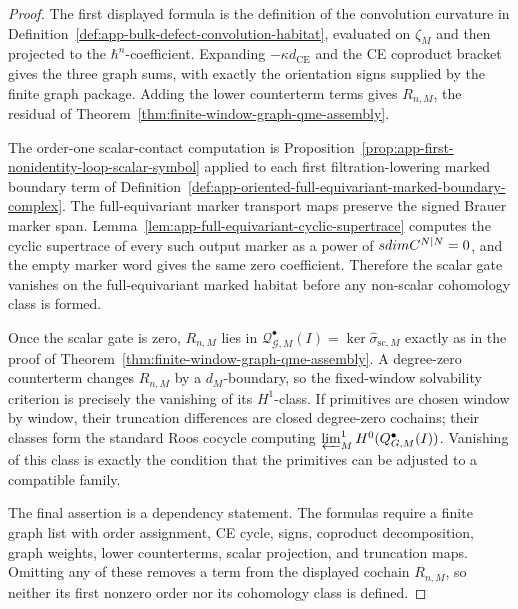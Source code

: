 \begin{proof}
  The first displayed formula is the definition of the convolution
  curvature in
  Definition~\ref{def:app-bulk-defect-convolution-habitat}, evaluated on
  \(\zeta_M\) and then projected to the \(\hbar^n\)-coefficient.  Expanding
  \(-\kappa d_{\mathrm{CE}}\) and the CE coproduct bracket gives the
  three graph sums, with exactly the orientation signs supplied by the
  finite graph package.  Adding the lower counterterm terms gives
  \(R_{n,M}\), the residual of
  Theorem~\ref{thm:finite-window-graph-qme-assembly}.

  The order-one scalar-contact computation is
  Proposition~\ref{prop:app-first-nonidentity-loop-scalar-symbol} applied
  to each first filtration-lowering marked boundary term of
  Definition~\ref{def:app-oriented-full-equivariant-marked-boundary-complex}.
  The full-equivariant marker transport maps preserve the signed Brauer
  marker span.  Lemma~\ref{lem:app-full-equivariant-cyclic-supertrace}
  computes the cyclic supertrace of every such output marker as a power
  of \(\operatorname{sdim}\C^{N|N}=0\), and the empty marker word gives the
  same zero coefficient.  Therefore the scalar gate vanishes on the
  full-equivariant marked habitat before any non-scalar cohomology class
  is formed.

  Once the scalar gate is zero, \(R_{n,M}\) lies in
  \(\mathcal Q^\bullet_{\mathcal G,M}(I)=
  \ker\widehat\sigma_{\mathrm{sc},M}\) exactly as in the proof of
  Theorem~\ref{thm:finite-window-graph-qme-assembly}.  A degree-zero
  counterterm changes \(R_{n,M}\) by a \(d_M\)-boundary, so the
  fixed-window solvability criterion is precisely the vanishing of its
  \(H^1\)-class.  If primitives are chosen window by window, their
  truncation differences are closed degree-zero cochains; their classes
  form the standard Roos cocycle computing
  \(\varprojlim^1_M H^0(\mathcal Q^\bullet_{\mathcal G,M}(I))\).  Vanishing
  of this class is exactly the condition that the primitives can be
  adjusted to a compatible family.

  The final assertion is a dependency statement.  The formulas require a
  finite graph list with order assignment, CE cycle, signs, coproduct
  decomposition, graph weights, lower counterterms, scalar projection, and
  truncation maps.  Omitting any of these removes a term from the displayed
  cochain \(R_{n,M}\), so neither its first nonzero order nor its
  cohomology class is defined.
\end{proof}

